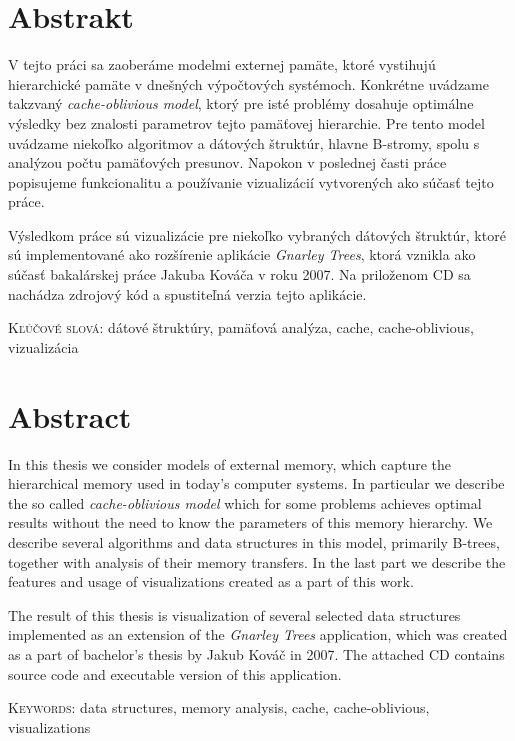 \chapter*{Abstrakt}

V tejto práci sa zaoberáme modelmi externej pamäte, ktoré vystihujú hierarchické pamäte v dnešných výpočtových systémoch. Konkrétne uvádzame takzvaný \emph{cache-oblivious model}, ktorý pre isté problémy dosahuje optimálne výsledky bez znalosti parametrov tejto pamäťovej hierarchie. Pre tento model uvádzame niekoľko algoritmov a dátových štruktúr, hlavne B-stromy, spolu s analýzou počtu pamäťových presunov. Napokon v poslednej časti práce popisujeme funkcionalitu a používanie vizualizácií vytvorených ako súčasť tejto práce.

Výsledkom práce sú vizualizácie pre niekoľko vybraných \obliv dátových štruktúr, ktoré sú implementované ako rozšírenie aplikácie \emph{Gnarley Trees}, ktorá vznikla ako súčasť bakalárskej práce Jakuba Kováča v roku 2007. Na priloženom CD sa nachádza zdrojový kód a spustiteľná verzia tejto aplikácie.


\vspace{2cm}
\noindent\textsc{Kľúčové slová:} dátové štruktúry, pamäťová analýza, cache, cache-oblivious, vizualizácia

\newpage
\chapter*{Abstract}
In this thesis we consider models of external memory, which capture the hierarchical memory used in today's computer systems. In particular we describe the so called \emph{cache-oblivious model} which for some problems achieves optimal results without the need to know the parameters of this memory hierarchy. We describe several algorithms and data structures in this model, primarily B-trees, together with analysis of their memory transfers. In the last part we describe the features and usage of visualizations created as a part of this work.

The result of this thesis is visualization of several selected \obliv data structures implemented as an extension of the \emph{Gnarley Trees} application, which was created as a part of bachelor's thesis by Jakub Kováč in 2007. The attached CD contains source code and executable version of this application. 

\vspace{2cm}
\noindent\textsc{Keywords:} data structures, memory analysis, cache, cache-oblivious, visualizations